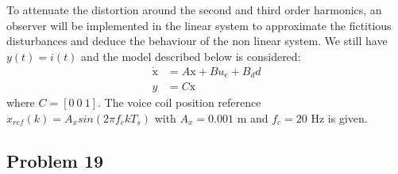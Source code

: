 To attenuate the distortion around the second and third order harmonics, an observer will be implemented in the linear system to approximate the fictitious disturbances and deduce the behaviour of the non linear system.
We still have $y(t) = i(t)$ and the model described below is considered:
\begin{align*}
\dot{\text{x}} &= A\text{x} + Bu_e + B_d d \\
y &= C \text{x}
\end{align*}
where $C = [0 \ 0 \ 1]$.
The voice coil position reference $x_{ref}(k) = A_x sin(2\pi f_c kT_s)$ with $A_x = 0.001$ m and $f_c = 20$ Hz is given. 

\subsection*{Problem 19}

